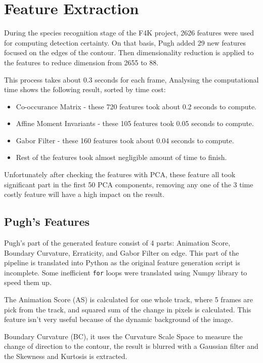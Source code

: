 \documentclass[bsc,logo,twoside,fullspacing,parskip]{infthesis}
\begin{document}
\section{Feature Extraction}

During the species recognition stage of the F4K project, 2626 features were used for computing detection certainty. 
On that basis, Pugh added 29 new features focused on the edges of the contour. Then dimensionality reduction is applied to the features to reduce dimension from 2655 to 88. 

This process takes about 0.3 seconds for each frame, Analysing the computational time shows the following result, sorted by time cost:
\begin{itemize}
\item
Co-occurance Matrix - these 720 features took about 0.2 seconds to compute.
\item
Affine Moment Invariants - these 105 features took 0.05 seconds to compute.
\item
Gabor Filter - these 160 features took about 0.04 seconds to compute.
\item
Rest of the features took almost negligible amount of time to finish.
\end{itemize}
Unfortunately after checking the features with PCA, these feature all took significant part in the first 50 PCA components, removing any one of the 3 time costly feature will have a high impact on the result.

\subsection{Pugh's Features}

Pugh's part of the generated feature consist of 4 parts: Animation Score, Boundary Curvature, Erraticity, and Gabor Filter on edge. This part of the pipeline is translated into Python as the original feature generation script is incomplete. Some inefficient {\tt for} loops were translated using Numpy library to speed them up.

The Animation Score (AS) is calculated for one whole track, where 5 frames are pick from the track, and squared sum of the change in pixels is calculated. This feature isn't very useful because of the dynamic background of the image.

Boundary Curvature (BC), it uses the Curvature Scale Space to measure the change of direction to the contour, the result is blurred with a Gaussian filter and the Skewness and Kurtosis is extracted. 
\end{document}
